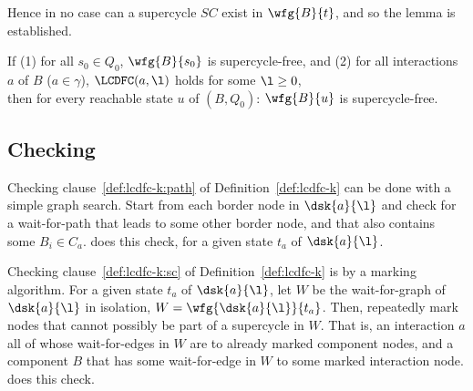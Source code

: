 {%




Hence in no case can a supercycle $SC$ exist in $\wfg{B}{t}$, and so the lemma is established.
}



\label{theorem:relComplete:deadlock-free}
If (1) for all $s_0 \in Q_0$, $\wfg{B}{s_0}$ is supercycle-free, and
(2) for all interactions $a$ of $B$ ($a \in \gamma$), $\LCDFC(a,\l)$ holds for some $\l \ge 0$,\\
 then for every reachable state $u$ of $(B, Q_0)$:  $\wfg{B}{u}$ is supercycle-free.
\et
%






\subsection{Checking \LCDFC}


Checking clause~\ref{def:lcdfc-k:path} of Definition~\ref{def:lcdfc-k} can be done with a simple graph search. Start from
each border node in $\dsk{a}{\l}$ and check for a wait-for-path that leads to some other border node, and that also
contains some $B_i \in C_a$.  does this check, for a given state $t_a$ of  $\dsk{a}{\l}$.

Checking clause~\ref{def:lcdfc-k:sc} of Definition~\ref{def:lcdfc-k} is by a marking algorithm. For a 
given state $t_a$ of  $\dsk{a}{\l}$, let $W$ be the wait-for-graph of $\dsk{a}{\l}$ in isolation, \ie $W
= \wfg{\dsk{a}{\l}}{t_a}$. Then, repeatedly mark nodes that cannot possibly be part of a supercycle in $W$. 
That is, an interaction $a$ all of whose wait-for-edges in $W$ are to already marked component nodes, and a 
component $B$ that has some wait-for-edge in $W$ to some marked interaction node.
 does this check.

